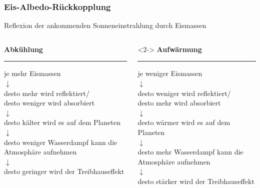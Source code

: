 \begin{frame}
	\frametitle{Eis-Albedo-Rückkopplung}%
	 Reflexion der ankommenden Sonneneinstrahlung durch Eismassen

	 \begin{columns}[T] %
	 	\begin{column}{.48\textwidth}
	 		\centering
	 		\textbf{Abkühlung}\\
	 		\color{blue}\rule{\linewidth}{4pt}
	 		\color{black}
	 		je mehr Eismassen\\
	 		$\downarrow$\\
	 		desto mehr wird reflektiert/\\
	 		desto weniger wird absorbiert\\
	 		$\downarrow$\\
	 		desto kälter wird es auf dem Planeten\\
	 		$\downarrow$\\
	 		desto weniger Wasserdampf kann die Atmosphäre aufnehmen\\
	 		$\downarrow$\\
	 		desto geringer wird der Treibhauseffekt
	 	\end{column}%
	 	\hfill%
	 	\begin{column}{.48\textwidth}<2->
	 		\centering
	 		\textbf{Aufwärmung}\\
	 		\color{red}\rule{\linewidth}{4pt}
	 		\color{black}
	 		je weniger Eismassen\\
	 		$\downarrow$\\
	 		desto weniger wird reflektiert/\\
	 		desto mehr wird absorbiert\\
	 		$\downarrow$\\
	 		desto wärmer wird es auf dem Planeten\\
	 		$\downarrow$\\
	 		desto mehr Wasserdampf kann die Atmosphäre aufnehmen\\
	 		$\downarrow$\\
	 		desto stärker wird der Treibhauseffekt
	 	\end{column}%
	 \end{columns}

\end{frame}

